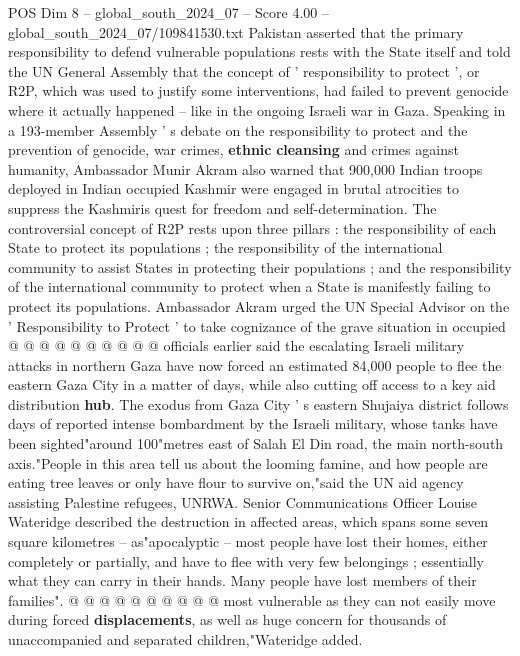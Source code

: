 \begin{textsample}{POS Dim 8 – global\_south\_2024\_07 – Score 4.00 – global\_south\_2024\_07/109841530.txt}  \label{ex:f8_pos_335}
Pakistan asserted that the primary responsibility to defend vulnerable populations rests with the State itself and told the UN General Assembly that the concept of ' responsibility to protect ', or R2P, which was used to justify some interventions, had failed to prevent genocide where it actually happened -- like in the ongoing Israeli war in Gaza.
Speaking in a 193-member Assembly ' s debate on the responsibility to protect and the prevention of genocide, war crimes, \textbf{ethnic} \textbf{cleansing} and crimes against humanity, Ambassador Munir Akram also warned that 900,000 Indian troops deployed in Indian occupied Kashmir were engaged in brutal atrocities to suppress the Kashmiris quest for freedom and self-determination.
The controversial concept of R2P rests upon three pillars : the responsibility of each State to protect its populations ; the responsibility of the international community to assist States in protecting their populations ; and the responsibility of the international community to protect when a State is manifestly failing to protect its populations.
Ambassador Akram urged the UN Special Advisor on the ' Responsibility to Protect ' to take cognizance of the grave situation in occupied @ @ @ @ @ @ @ @ @ @ officials earlier said the escalating Israeli military attacks in northern Gaza have now forced an estimated 84,000 people to flee the eastern Gaza City in a matter of days, while also cutting off access to a key aid distribution \textbf{hub}.
The exodus from Gaza City ' s eastern Shujaiya district follows days of reported intense bombardment by the Israeli military, whose tanks have been sighted"around 100"metres east of Salah El Din road, the main north-south axis."People in this area tell us about the looming famine, and how people are eating tree leaves or only have flour to survive on,"said the UN aid agency assisting Palestine refugees, UNRWA.
Senior Communications Officer Louise Wateridge described the destruction in affected areas, which spans some seven square kilometres -- as"apocalyptic -- most people have lost their homes, either completely or partially, and have to flee with very few belongings ; essentially what they can carry in their hands.
Many people have lost members of their families". @ @ @ @ @ @ @ @ @ @ most vulnerable as they can not easily move during forced \textbf{displacements}, as well as huge concern for thousands of unaccompanied and separated children,"Wateridge added.

\end{textsample}

